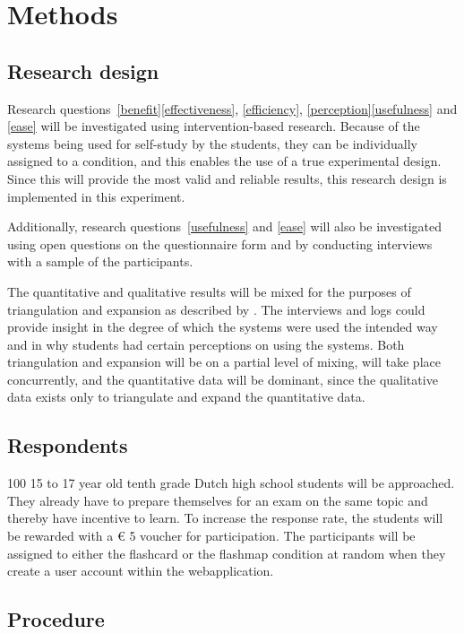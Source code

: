 \chapter{Methods}
\label{ch:methods}

\section{Research design}
\label{sec:researchdesign}

Research questions~\ref{benefit}\ref{effectiveness}, \ref{efficiency}, \ref{perception}\ref{usefulness} and \ref{ease} will be investigated using intervention-based research. Because of the systems being used for self-study by the students, they can be individually assigned to a condition, and this enables the use of a true experimental design. Since this will provide the most valid and reliable results, this research design is implemented in this experiment.

Additionally, research questions~\ref{usefulness} and \ref{ease} will also be investigated using open questions on the questionnaire form and by conducting interviews with a sample of the participants.

The quantitative and qualitative results will be mixed for the purposes of triangulation and expansion as described by . The interviews and logs could provide insight in the degree of which the systems were used the intended way and in why students had certain perceptions on using the systems. Both triangulation and expansion will be on a partial level of mixing, will take place concurrently, and the quantitative data will be dominant, since the qualitative data exists only to triangulate and expand the quantitative data. 

\section{Respondents}
\label{sec:respondents}

100 15 to 17 year old tenth grade Dutch high school students will be approached. They already have to prepare themselves for an exam on the same topic and thereby have incentive to learn. To increase the response rate, the students will be rewarded with a \euro{} 5 voucher for participation. The participants will be assigned to either the flashcard or the flashmap condition at random when they create a user account within the webapplication.

\section{Procedure}
\label{sec:procedure}

